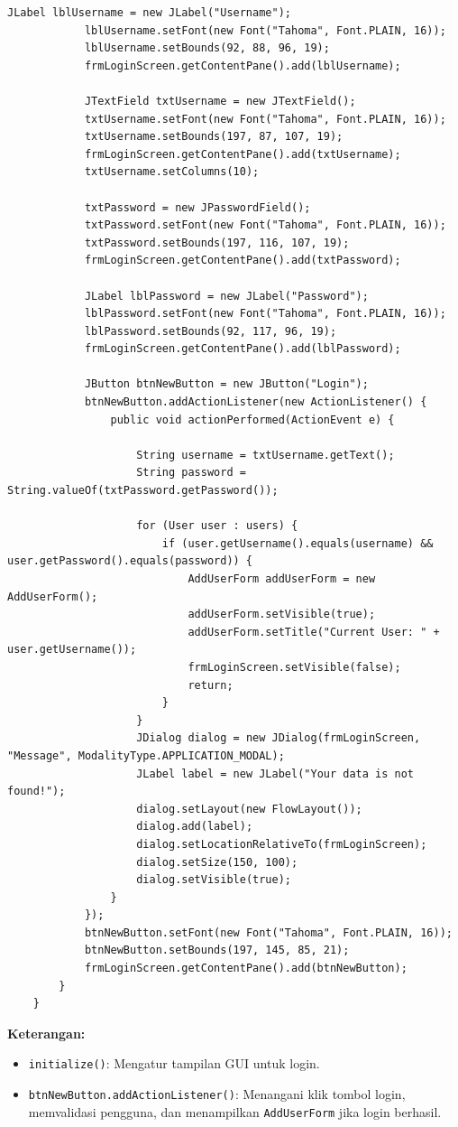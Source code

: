 \begin{lstlisting}[style=JavaStyle]
			JLabel lblUsername = new JLabel("Username");
			lblUsername.setFont(new Font("Tahoma", Font.PLAIN, 16));
			lblUsername.setBounds(92, 88, 96, 19);
			frmLoginScreen.getContentPane().add(lblUsername);
			
			JTextField txtUsername = new JTextField();
			txtUsername.setFont(new Font("Tahoma", Font.PLAIN, 16));
			txtUsername.setBounds(197, 87, 107, 19);
			frmLoginScreen.getContentPane().add(txtUsername);
			txtUsername.setColumns(10);
			
			txtPassword = new JPasswordField();
			txtPassword.setFont(new Font("Tahoma", Font.PLAIN, 16));
			txtPassword.setBounds(197, 116, 107, 19);
			frmLoginScreen.getContentPane().add(txtPassword);
			
			JLabel lblPassword = new JLabel("Password");
			lblPassword.setFont(new Font("Tahoma", Font.PLAIN, 16));
			lblPassword.setBounds(92, 117, 96, 19);
			frmLoginScreen.getContentPane().add(lblPassword);
			
			JButton btnNewButton = new JButton("Login");
			btnNewButton.addActionListener(new ActionListener() {
				public void actionPerformed(ActionEvent e) {
					
					String username = txtUsername.getText();
					String password = String.valueOf(txtPassword.getPassword());
					
					for (User user : users) {
						if (user.getUsername().equals(username) && user.getPassword().equals(password)) {
							AddUserForm addUserForm = new AddUserForm();
							addUserForm.setVisible(true);
							addUserForm.setTitle("Current User: " + user.getUsername());
							frmLoginScreen.setVisible(false);
							return;
						}
					}
					JDialog dialog = new JDialog(frmLoginScreen, "Message", ModalityType.APPLICATION_MODAL);
					JLabel label = new JLabel("Your data is not found!");
					dialog.setLayout(new FlowLayout());
					dialog.add(label);
					dialog.setLocationRelativeTo(frmLoginScreen);
					dialog.setSize(150, 100);
					dialog.setVisible(true);
				}
			});
			btnNewButton.setFont(new Font("Tahoma", Font.PLAIN, 16));
			btnNewButton.setBounds(197, 145, 85, 21);
			frmLoginScreen.getContentPane().add(btnNewButton);
		}
	}
\end{lstlisting}

\textbf{Keterangan:} 
\begin{itemize}
	\item \texttt{initialize()}: Mengatur tampilan GUI untuk login.
	\item \texttt{btnNewButton.addActionListener()}: Menangani klik tombol login, memvalidasi pengguna, dan menampilkan \texttt{AddUserForm} jika login berhasil.
\end{itemize}

